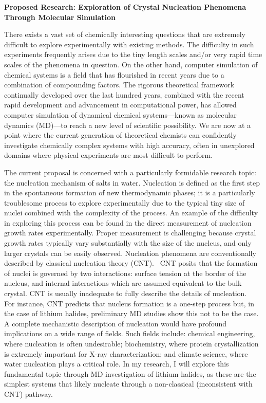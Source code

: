 \documentclass[notitlepage,letterpaper,onecolumn,12pt,final]{article}
\begin{document}
%
\noindent\textbf{Proposed Research: Exploration of Crystal Nucleation Phenomena Through Molecular Simulation}
\smallskip

There exists a vast set of chemically interesting questions that are extremely difficult to explore experimentally with existing methods. The difficulty in such experiments frequently arises due to the tiny length scales and/or very rapid time scales of the phenomena in question. On the other hand, computer simulation of chemical systems is a field that has flourished in recent years due to a combination of compounding factors. The rigorous theoretical framework continually developed over the last hundred years, combined with the recent rapid development and advancement in computational power, has allowed computer simulation of dynamical chemical systems---known as molecular dynamics (MD)---to reach a new level of scientific possibility. We are now at a point where the current generation of theoretical chemists can confidently investigate chemically complex systems with high accuracy, often in unexplored domains where physical experiments are most difficult to perform.

The current proposal is concerned with a particularly formidable research topic: the nucleation mechanism of salts in water. Nucleation is defined as the first step in the spontaneous formation of new thermodynamic phases; it is a particularly troublesome process to explore experimentally due to the typical tiny size of nuclei combined with the complexity of the process. An example of the difficulty in exploring this process can be found in the direct measurement of nucleation growth rates experimentally. Proper measurement is challenging because crystal growth rates typically vary substantially with the size of the nucleus, and only larger crystals can be easily observed. Nucleation phenomena are conventionally described by classical nucleation theory (CNT).~\supercite{Karthika2016} CNT posits that the formation of nuclei is governed by two interactions: surface tension at the border of the nucleus, and internal interactions which are assumed equivalent to the bulk crystal. CNT is usually inadequate to fully describe the details of nucleation.~\supercite{Karthika2016} For instance, CNT predicts that nucleus formation is a one-step process but, in the case of lithium halides, preliminary MD studies show this not to be the case.~\supercite{Lanaro2018} A complete mechanistic description of nucleation would have profound implications on a wide range of fields. Such fields include: chemical engineering, where nucleation is often undesirable; biochemistry, where protein crystallization is extremely important for X-ray characterization; and climate science, where water nucleation plays a critical role. In my research, I will explore this fundamental topic through MD investigation of lithium halides, as these are the simplest systems that likely nucleate through a non-classical (inconsistent with CNT) pathway.~\supercite{Lanaro2018}
\end{document}
